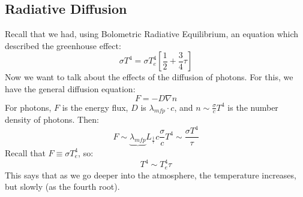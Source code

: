 \documentclass{article}
\begin{document}
\subsection*{ Radiative Diffusion}

Recall that we had, using Bolometric Radiative Equilibrium, an equation which
described the greenhouse effect:
$$\sigma T^4=\sigma T_e^4\left[\frac{1}{2}+\frac{3}{4}\tau\right]$$
Now we want to talk about the effects of the diffusion of photons.  For this,
we have the general diffusion equation:
$$F=-D\nabla n$$
For photons, $F$ is the energy flux, $D$ is $\lambda_{mfp}\cdot c$, 
and $n\sim\frac{\sigma}{ c}T^4$ is the number density of photons.  Then:
$$F\sim\underbrace{\lambda_{mfp}}{ L}_{\frac{1}{\tau}}c\frac{\sigma}{ c}T^4
\sim\frac{\sigma T^4}{\tau}$$
Recall that $F\equiv\sigma T_e^4$, so:
$$T^4\sim T_e^4\tau$$
This says that as we go deeper into the atmosphere, the temperature increases,
but slowly (as the fourth root).  
\end{document}
